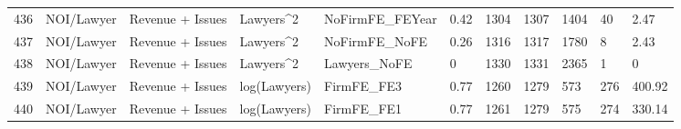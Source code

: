 \begin{table}[ht]
\begin{tabular}{rllllllllll}
  436 & NOI/Lawyer & Revenue + Issues & Lawyers^2 & NoFirmFE\_FEYear & 0.42 & 1304 & 1307 & 1404 & 40 & 2.47 \\ 
  437 & NOI/Lawyer & Revenue + Issues & Lawyers^2 & NoFirmFE\_NoFE & 0.26 & 1316 & 1317 & 1780 & 8 & 2.43 \\ 
  438 & NOI/Lawyer & Revenue + Issues & Lawyers^2 & Lawyers\_NoFE & 0 & 1330 & 1331 & 2365 & 1 & 0 \\ 
  439 & NOI/Lawyer & Revenue + Issues & log(Lawyers) & FirmFE\_FE3 & 0.77 & 1260 & 1279 & 573 & 276 & 400.92 \\ 
  440 & NOI/Lawyer & Revenue + Issues & log(Lawyers) & FirmFE\_FE1 & 0.77 & 1261 & 1279 & 575 & 274 & 330.14 \\ 
   \hline
\end{tabular}
\end{table}
